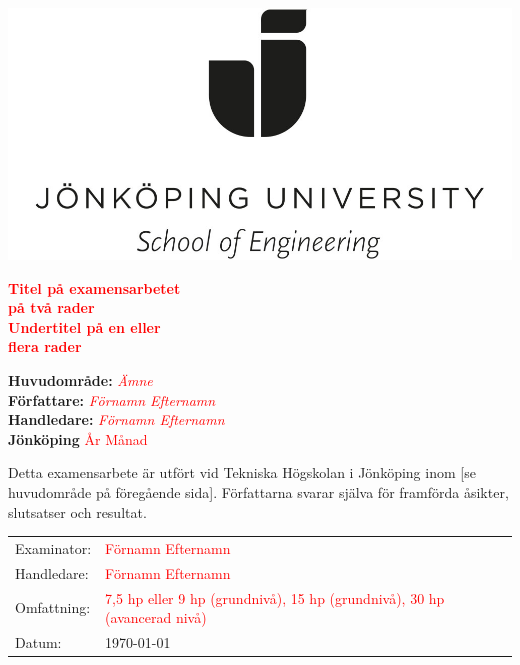 \documentclass[12pt,a4paper]{article}
\begin{document}
\pagestyle{empty}

\includegraphics[width=6 cm]{Bilder/JU_logga_stor.jpg}
\vfill

\textbf{\LARGE \textcolor{red}{Titel på examensarbetet \\ på två rader} }
\\[0.6cm]

\textbf{\large \textcolor{red}{Undertitel på en eller\\flera rader} }
\vfill


\textbf{Huvudområde:} \textit{\textcolor{red}{Ämne} } \\
\textbf{Författare:} \textit{\textcolor{red}{Förnamn Efternamn} }\\
\textbf{Handledare:} \textit{\textcolor{red}{Förnamn Efternamn} }\\
\textbf{Jönköping} \textcolor{red}{År Månad} %


\newpage
\pagestyle{fancy}


\vspace*{\fill}

Detta examensarbete är utfört vid Tekniska Högskolan i Jönköping inom [se huvudområde på föregående sida]. Författarna svarar själva för framförda åsikter, slutsatser och resultat.\\
\begin{tabular}{@{}ll}
Examinator: & \textcolor{red}{Förnamn Efternamn} \\
Handledare: & \textcolor{red}{Förnamn Efternamn} \\
Omfattning: & \textcolor{red}{7,5 hp eller 9 hp (grundnivå), 15 hp (grundnivå), 30 hp (avancerad nivå)} \\
Datum:      & \today
\end{tabular}

\let\Sectionmark\sectionmark
\def\sectionmark#1{\def\Sectionname{#1}\Sectionmark{#1}}

\renewcommand{\headrulewidth}{0pt}
\renewcommand{\footrulewidth}{0.4pt}
\end{document}
